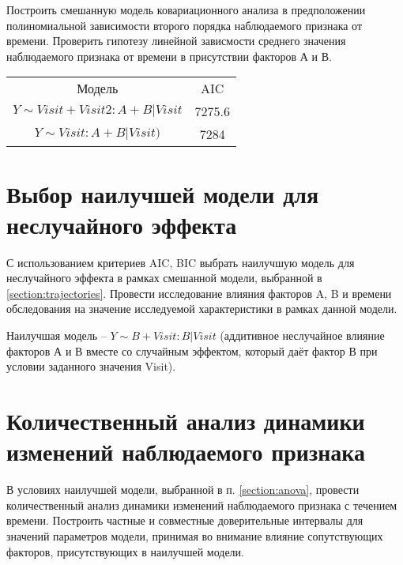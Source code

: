 \documentclass[a4paper,12pt]{article}
\begin{document}
\begin{leftbar}
Построить смешанную модель ковариационного анализа в предположении полиномиальной зависимости второго порядка наблюдаемого признака от времени.
Проверить гипотезу линейной зависмости среднего значения наблюдаемого признака от времени в присутствии факторов А и В.
\end{leftbar}

\begin{tabular}{cc}
	Модель & AIC \\
	$ Y \sim Visit + Visit2: A + B | Visit $ & 7275.6 \\
	$ Y \sim Visit: A + B | Visit) $ & 7284 \\
\end{tabular}

\section{ Выбор наилучшей модели для неслучайного эффекта }

\begin{leftbar}
С использованием критериев AIC, BIC выбрать наилучшую модель для неслучайного эффекта в рамках смешанной модели, выбранной в  \ref{section:trajectories}.
Провести исследование влияния факторов A, B и времени обследования на значение исследуемой характеристики в рамках данной модели.
\end{leftbar}

Наилучшая модель -- $ Y \sim B + Visit : B | Visit $  (аддитивное неслучайное влияние факторов А и В вместе со случайным эффектом, который даёт фактор В при условии заданного значения Visit).

\section{ Количественный анализ динамики изменений наблюдаемого признака }

\begin{leftbar}
В условиях наилучшей модели, выбранной в п. \ref{section:anova}, провести количественный анализ динамики изменений наблюдаемого признака с течением времени.
Построить частные и совместные доверительные интервалы для значений параметров модели, принимая во внимание влияние сопутствующих факторов, присутствующих в наилучшей модели.
\end{leftbar}
	
\end{document}
